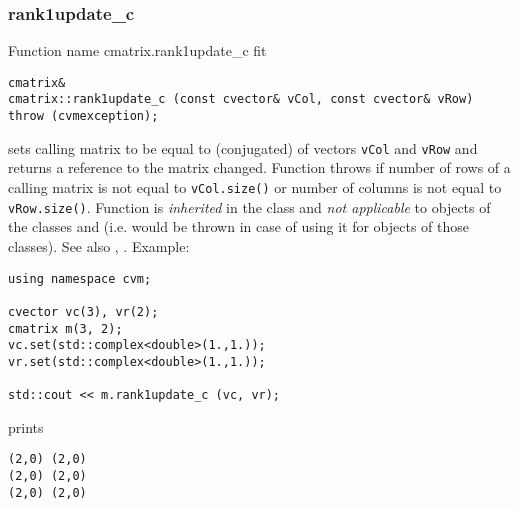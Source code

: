 \subsubsection{rank1update\_c}
Function%
\pdfdest name {cmatrix.rank1update_c} fit
\begin{verbatim}
cmatrix&
cmatrix::rank1update_c (const cvector& vCol, const cvector& vRow)
throw (cvmexception);
\end{verbatim}
sets calling matrix to be equal to 
 (conjugated) of vectors
\verb"vCol" and \verb"vRow"
and returns a reference to
the matrix changed.
Function throws  
if number of rows of a calling matrix
is not equal to \verb"vCol.size()"
or number of columns is not equal to \verb"vRow.size()".
Function is \emph{inherited} in the class
 and
\emph{not applicable} to objects of the classes
 and
 (i.e. 
 would be thrown
in case of using it for objects of those classes).
See also ,
.
Example:
\begin{Verbatim}
using namespace cvm;

cvector vc(3), vr(2);
cmatrix m(3, 2);
vc.set(std::complex<double>(1.,1.));
vr.set(std::complex<double>(1.,1.));

std::cout << m.rank1update_c (vc, vr);
\end{Verbatim}
prints
\begin{Verbatim}
(2,0) (2,0)
(2,0) (2,0)
(2,0) (2,0)
\end{Verbatim}
\newpage



